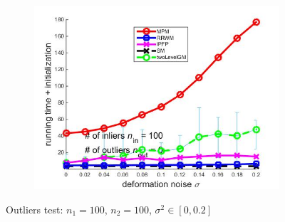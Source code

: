 \documentclass[
	fontsize=12pt,
	paper=a4,
	twoside=false,
	numbers=noenddot,
	plainheadsepline,
	toc=listof,
	toc=bibliography
]{scrartcl}
\begin{document}
\begin{figure}[h]
\begin{subfigure}[b]{0.3\textwidth}
		\includegraphics[scale=0.25]{"fig_ver2608/syntheticPointSets/ver4.3/deformation/time_summary_avg10t"} 
				\caption{} 
	\end{subfigure} 	
	\caption{Outliers test: $n_1=100$, $n_2=100$, $\sigma^2\in[0, 0.2]$}
	\label{fig:test1_ver43}
\end{figure}

\FloatBarrier	
\end{document}

